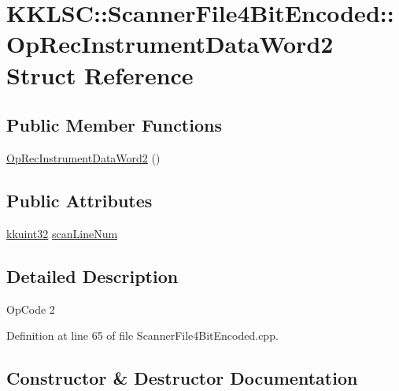 \hypertarget{struct_scanner_file4_bit_encoded_1_1_op_rec_instrument_data_word2}{}\section{K\+K\+L\+SC\+:\+:Scanner\+File4\+Bit\+Encoded\+:\+:Op\+Rec\+Instrument\+Data\+Word2 Struct Reference}
\label{struct_scanner_file4_bit_encoded_1_1_op_rec_instrument_data_word2}
\subsection*{Public Member Functions}
\begin{DoxyCompactItemize}
\item 
\hyperlink{struct_scanner_file4_bit_encoded_1_1_op_rec_instrument_data_word2_a858f34c8bccf9ccf1ceaffc8c03a2517}{Op\+Rec\+Instrument\+Data\+Word2} ()
\end{DoxyCompactItemize}
\subsection*{Public Attributes}
\begin{DoxyCompactItemize}
\item 
\hyperlink{namespace_k_k_b_af8d832f05c54994a1cce25bd5743e19a}{kkuint32} \hyperlink{struct_scanner_file4_bit_encoded_1_1_op_rec_instrument_data_word2_ab5b253be5598eecaba19f36630e431be}{scan\+Line\+Num}
\end{DoxyCompactItemize}


\subsection{Detailed Description}
Op\+Code 2 

Definition at line 65 of file Scanner\+File4\+Bit\+Encoded.\+cpp.



\subsection{Constructor \& Destructor Documentation}
